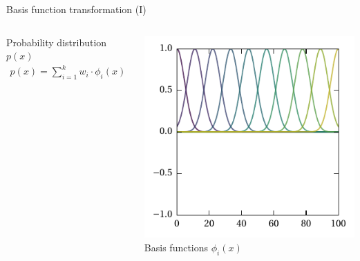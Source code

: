 \documentclass[aspectratio=169]{beamer}
\begin{document}
\begin{frame}{Basis function transformation (I)}
\begin{columns}[T]
	\begin{block}{Probability distribution $p(x)$}
	\begin{align*}
		p(x) = \sum_{i = 1}^k w_i \cdot \phi_i(x)
	\end{align*}
	\end{block}
	\centering
	\includegraphics[width=\textwidth]{media/basis_gaussian_distr.pdf}\\
	\footnotesize Basis functions $\phi_i(x)$
\end{columns}
\end{frame}
\end{document}
